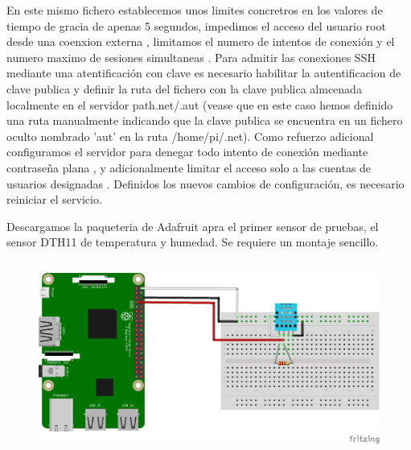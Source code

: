 En este mismo fichero establecemos unos limites concretros en los valores de tiempo de gracia  de apenas 5 segundos, impedimos el acceso del usuario root desde una coenxion externa , limitamos el numero de intentos de conexión  y el numero maximo de sesiones simultaneas . Para admitir las conexiones SSH mediante una atentificación con clave es necesario habilitar la autentificacion de clave publica  y definir la ruta del fichero con la clave publica almcenada localmente en el servidor  path{.net/.aut} (vease que en este caso hemos definido una ruta manualmente indicando que la clave publica se encuentra en un fichero oculto nombrado 'aut' en la ruta /home/pi/.net). Como refuerzo adicional configuramos el servidor para denegar todo intento de conexión mediante contraseña plana , y adicionalmente limitar el acceso solo a las cuentas de usuarios designadas . Definidos los nuevos cambios de configuración, es necesario reiniciar el servicio.

Descargamos la paqueteria de Adafruit apra el primer sensor de pruebas, el sensor DTH11 de temperatura y humedad.
Se requiere un montaje sencillo.
\begin{figure}[hbt!]
\centering
\includegraphics[height=2.5in]{figures/nodo_1.png}
\end{figure}

